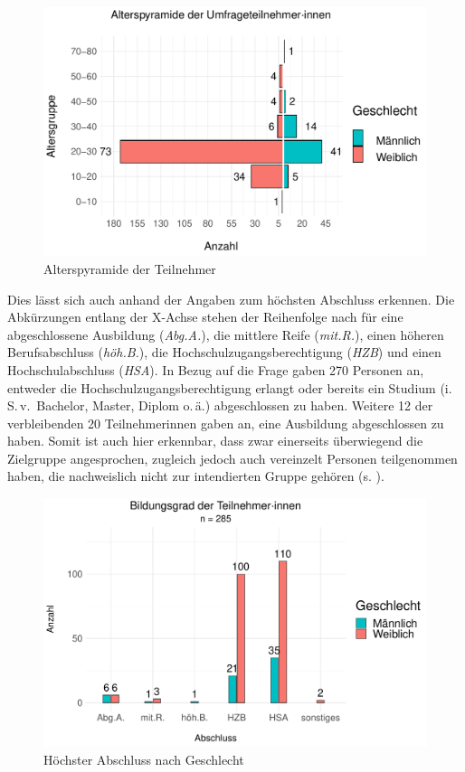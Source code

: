 
\begin{figure}
    \includegraphics[width=.85\textwidth]{Figures/Umfrage/GGplot/ggplot_alterspyramide}
    \caption{Alterspyramide der Teilnehmer\label{K6:fig:alterspyramide}}
\end{figure}


Dies lässt sich auch anhand der Angaben zum höchsten Abschluss erkennen. Die Abkürzungen entlang der X-Achse stehen der Reihenfolge nach für eine abgeschlossene Ausbildung (\emph{Abg.A.}), die mittlere Reife (\emph{mit.R.}), einen höheren Berufsabschluss (\emph{höh.B.}), die Hochschulzugangsberechtigung (\emph{HZB}) und einen Hochschulabschluss (\emph{HSA}). In Bezug auf die Frage gaben 270 Personen an, entweder die Hochschulzugangsberechtigung erlangt oder bereits ein Studium (i.\,S.\,v.\ Bachelor, Master, Diplom o.\,ä.) abgeschlossen zu haben. Weitere 12 der verbleibenden 20 Teilnehmer{\textperiodcentered}innen gaben an, eine Ausbildung abgeschlossen zu haben. Somit ist auch hier erkennbar, dass zwar einerseits überwiegend die Zielgruppe angesprochen, zugleich jedoch auch vereinzelt Personen teilgenommen haben, die nachweislich nicht zur intendierten Gruppe gehören (s. ).


\begin{figure}
		\includegraphics[width=.85\textwidth]{Figures/Umfrage/GGplot/ggplot_Geschlecht-Abschluss}
	\caption{Höchster Abschluss nach Geschlecht\label{K6:fig:Abschluss-nw}}
\end{figure}

